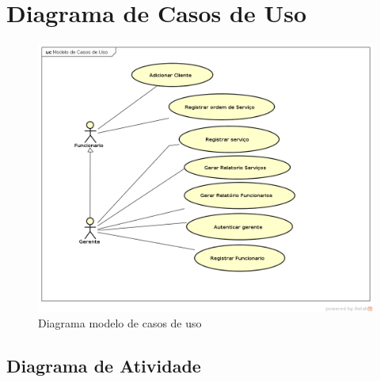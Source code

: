 \documentclass[
	12pt,				%
	openright,
	oneside,			%
	a4paper,			%
	chapter=TITLE,		%
	brazil				%
	]{abntex2}
\begin{document}
\chapter{Diagrama de Casos de Uso}

\begin{figure}[htb]
	\caption{Diagrama modelo de casos de uso}
	\begin{flushleft}
	    \includegraphics[scale=0.5]{Arquivos/caso_de_uso}  %
	\end{flushleft}
	\label{fig:caso_de_uso}
\end{figure}

\section{Diagrama de Atividade}
\end{document}
